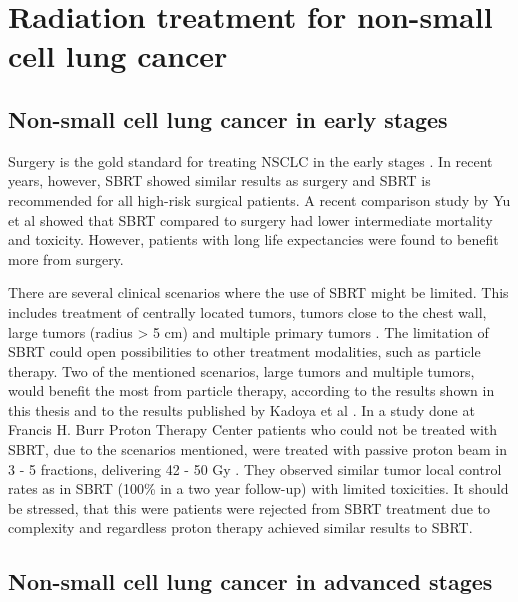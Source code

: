 \newpage
\section{Radiation treatment for non-small cell lung cancer}

\subsection{Non-small cell lung cancer in early stages}

Surgery is the gold standard for treating NSCLC in the early stages \cite{Roesch2014}. 
In recent years, however, SBRT showed similar results as surgery and SBRT is recommended for all high-risk surgical patients. A recent comparison study by Yu et al \cite{Yu2015} showed that
SBRT compared to surgery had lower intermediate mortality and toxicity. However, patients with long life expectancies were found to benefit more from surgery. 

There are several clinical scenarios where the use of SBRT might be limited. 
This includes treatment of centrally located tumors, tumors close to the chest wall, large tumors (radius > 5 cm) and 
multiple primary tumors \cite{Timmerman2006, Georg2008, Westover2012}.
The limitation of SBRT could open possibilities to other treatment modalities, such as particle therapy. 
Two of the mentioned scenarios, large tumors and multiple tumors, would benefit the most from particle therapy, according to the results shown
in this thesis and to the results published by Kadoya et al \cite{Kadoya2010}. In a study done at Francis H. Burr Proton Therapy Center 
patients who could not be treated with SBRT, due to the scenarios mentioned, were treated with passive proton beam in 3 - 5 fractions, 
delivering 42 - 50 Gy \cite{Westover2012}. They observed similar tumor local control rates as in SBRT (100\% in a two year follow-up) with limited toxicities. 
It should be stressed, that this were patients were rejected from SBRT treatment due to complexity and regardless proton therapy achieved similar results
to SBRT.


\subsection{Non-small cell lung cancer in advanced stages}

